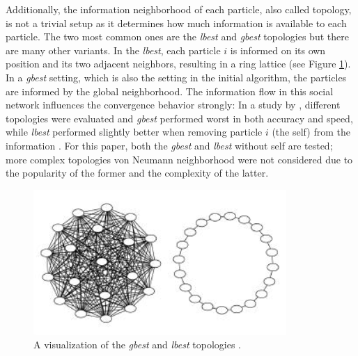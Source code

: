 Additionally, the information neighborhood of each particle, also called topology, is not a trivial setup as it determines how much information is available to each particle. The two most common ones are the \textit{lbest} and \textit{gbest} topologies but there are many other variants. In the \textit{lbest}, each particle $i$ is informed on its own position and its two adjacent neighbors, resulting in a ring lattice (see Figure \ref{Fig:topo}). In a \textit{gbest} setting, which is also the setting in the initial algorithm, the particles are informed by the global neighborhood. The information flow in this social network influences the convergence behavior strongly: In a study by \cite{kennedymendes}, different topologies were evaluated and \textit{gbest} performed worst in both accuracy and speed, while \textit{lbest} performed slightly better when removing particle $i$ (the self) from the information \cite[p. 1674]{kennedymendes}. For this paper, both the \textit{gbest} and \textit{lbest} without self are tested; more complex topologies von Neumann neighborhood were not considered due to the popularity of the former and the complexity of the latter.

\begin{figure}[ht]
	\begin{center}
		\includegraphics[scale=0.9]{topology}
		\caption{A visualization of the \textit{gbest} and \textit{lbest} topologies \cite[p. 1671]{kennedymendes}.}
		\label{Fig:topo}
	\end{center}
\end{figure}



